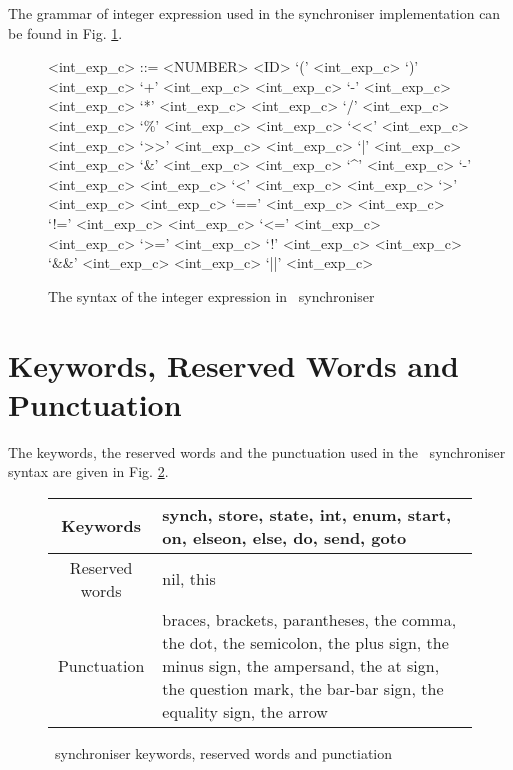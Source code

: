 The grammar of integer expression used in the synchroniser implementation can be found in Fig. \ref{int_exp_gr}.
\setlength{\grammarindent}{8em} %
\begin{figure}%
\scriptsize
\begin{grammar}
<int\_exp\_c> ::= <NUMBER>
                \alt <ID>
                \alt `(' <int\_exp\_c> `)'
                \alt <int\_exp\_c> `+' <int\_exp\_c>
                \alt <int\_exp\_c> `-' <int\_exp\_c>
                \alt <int\_exp\_c> `*' <int\_exp\_c>
                \alt <int\_exp\_c> `/' <int\_exp\_c>
                \alt <int\_exp\_c> `\%' <int\_exp\_c>
                \alt <int\_exp\_c> `<<' <int\_exp\_c>
                \alt <int\_exp\_c> `>>' <int\_exp\_c>
                \alt <int\_exp\_c> `|' <int\_exp\_c>
                \alt <int\_exp\_c> `&' <int\_exp\_c>
                \alt <int\_exp\_c> `^' <int\_exp\_c>
                \alt `-' <int\_exp\_c> %
                \alt <int\_exp\_c> `<' <int\_exp\_c>
                \alt <int\_exp\_c> `>' <int\_exp\_c>
                \alt <int\_exp\_c> `==' <int\_exp\_c>
                \alt <int\_exp\_c> `!=' <int\_exp\_c>
                \alt <int\_exp\_c> `<=' <int\_exp\_c>
                \alt <int\_exp\_c> `>=' <int\_exp\_c>
                \alt `!' <int\_exp\_c>
                \alt <int\_exp\_c> `&&' <int\_exp\_c>
                \alt <int\_exp\_c> `||' <int\_exp\_c>
\end{grammar}
\caption{The syntax of the integer expression in \ak\ synchroniser}
\label{int_exp_gr}
\end{figure}


    \section{Keywords, Reserved Words and Punctuation\label{sync_kw}}
The keywords, the reserved words and the punctuation used in the \ak\ synchroniser syntax are given in Fig. \ref{fig:sync_kw}.
\begin{figure}%
\centering
\begin{tabular}{|c|p{}|}
\hline
Keywords & synch, store, state, int, enum, start, on, elseon, else, do, send, goto\\
\hline
Reserved words & nil, this\\
\hline
Punctuation & braces, brackets, parantheses, the comma, the dot, the semicolon, the plus sign, the minus sign, the ampersand, the at sign, the question mark, the bar-bar sign, the equality sign, the arrow\\
\hline
\end{tabular}
\caption{\ak\ synchroniser keywords, reserved words and punctiation\label{fig:sync_kw}}
\end{figure}


